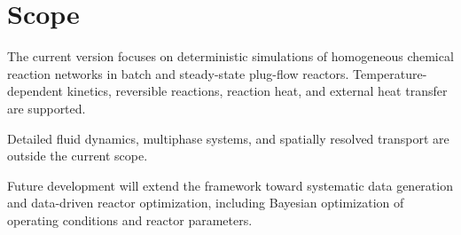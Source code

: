 \section{Scope}

The current version focuses on deterministic simulations of homogeneous
chemical reaction networks in batch and steady-state plug-flow reactors.
Temperature-dependent kinetics, reversible reactions, reaction heat, and
external heat transfer are supported.

Detailed fluid dynamics, multiphase systems, and spatially resolved transport
are outside the current scope.

Future development will extend the framework toward systematic data
generation and data-driven reactor optimization, including Bayesian
optimization of operating conditions and reactor parameters.

